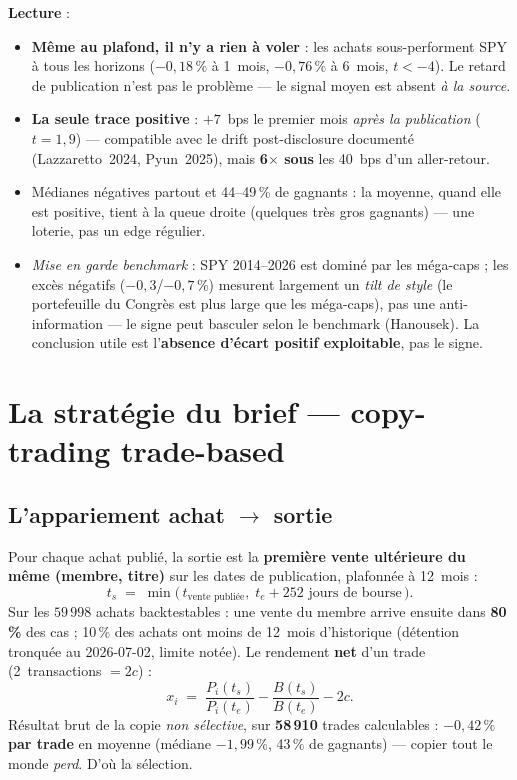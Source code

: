 \documentclass[11pt,a4paper]{article}
\begin{document}
\textbf{Lecture} :
\begin{itemize}[leftmargin=1.4em,itemsep=1pt]
\item \textbf{Même au plafond, il n'y a rien à voler} : les achats sous-performent SPY à tous les horizons
      ($-0{,}18\,\%$ à 1~mois, $-0{,}76\,\%$ à 6~mois, $t<-4$). Le retard de publication n'est pas le
      problème --- le signal moyen est absent \emph{à la source}.
\item \textbf{La seule trace positive} : $+7$~bps le premier mois \emph{après la publication} ($t=1{,}9$)
      --- compatible avec le drift post-disclosure documenté (Lazzaretto~2024, Pyun~2025), mais
      \textbf{6$\times$ sous} les 40~bps d'un aller-retour.
\item Médianes négatives partout et 44--49\,\% de gagnants : la moyenne, quand elle est positive, tient à
      la queue droite (quelques très gros gagnants) --- une loterie, pas un edge régulier.
\item \emph{Mise en garde benchmark} : SPY 2014--2026 est dominé par les méga-caps ; les excès négatifs
      ($-0{,}3$/$-0{,}7\,\%$) mesurent largement un \emph{tilt de style} (le portefeuille du Congrès est
      plus large que les méga-caps), pas une anti-information --- le signe peut basculer selon le
      benchmark (Hanousek). La conclusion utile est l'\textbf{absence d'écart positif exploitable}, pas
      le signe.
\end{itemize}

\section{La stratégie du brief --- copy-trading trade-based}\label{sec:brief}

\subsection{L'appariement achat $\to$ sortie}
Pour chaque achat publié, la sortie est la \textbf{première vente ultérieure du même (membre, titre)}
sur les dates de publication, plafonnée à 12~mois :
\begin{equation}
t_s \;=\; \min\big(\,t_{\text{vente publiée}},\; t_e + 252 \text{ jours de bourse}\,\big).
\end{equation}
Sur les $59\,998$ achats backtestables : une vente du membre arrive ensuite dans \textbf{80\,\%} des cas ;
10\,\% des achats ont moins de 12~mois d'historique (détention tronquée au 2026-07-02, limite notée).
Le rendement \textbf{net} d'un trade (2~transactions $=2c$) :
\begin{equation}
x_i \;=\; \frac{P_i(t_s)}{P_i(t_e)} - \frac{B(t_s)}{B(t_e)} - 2c .
\end{equation}
Résultat brut de la copie \emph{non sélective}, sur \textbf{58\,910} trades calculables :
\textbf{$-0{,}42\,\%$ par trade} en moyenne (médiane $-1{,}99\,\%$, 43\,\% de gagnants) --- copier tout le
monde \emph{perd}. D'où la sélection.
\end{document}
